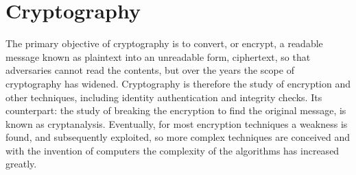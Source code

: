 \documentclass[12pt,twoside,a4paper]{report}
\begin{document}
    \section{Cryptography}
    The primary objective of cryptography is to convert, or encrypt, a readable message known as plaintext into an unreadable form, ciphertext, so that adversaries cannot read the contents, but over the years the scope of cryptography has widened.
    Cryptography is therefore the study of encryption and other techniques, including identity authentication and integrity checks. Its counterpart: the study of breaking the encryption to find the original message, is known as cryptanalysis\cite{AlfredJ.Menezes1996}.
    Eventually, for most encryption techniques a weakness is found, and subsequently exploited, so more complex techniques are conceived and with the invention of computers the complexity of the algorithms has increased greatly.
    
    
\end{document}
